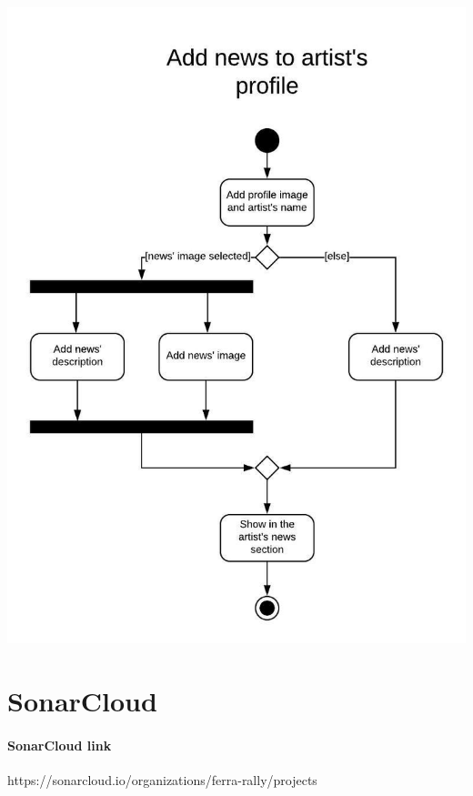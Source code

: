 \documentclass[11pt,a4paper]{article}
\begin{document}
\begin{itemize}
\includegraphics[scale=0.5]{addnews2.jpeg}
\section{SonarCloud}
\paragraph{SonarCloud link} https://sonarcloud.io/organizations/ferra-rally/projects
\end{itemize}
\end{document}

